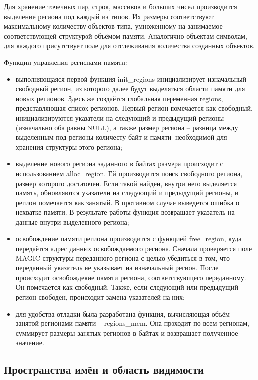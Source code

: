 Для хранение точечных пар, строк, массивов и больших чисел производится выделение региона под каждый из типов. Их размеры соответствуют максимальному количеству объектов типа, умноженному на занимаемое соответствующей структурой объёмом памяти. Аналогично объектам-символам, для каждого присутствует поле для отслеживания количества созданных объектов.

Функции управления регионами памяти:

\begin{itemize}
	\item выполняющаяся первой функция init\_regions инициализирует изначальный свободный регион, из которого далее будут выделяться области памяти для новых регионов. Здесь же создаётся глобальная переменная regions, представляющая список регионов. Первый регион помечается как свободный, инициализируются указатели на следующий и предыдущий регионы (изначально оба равны NULL), а также размер региона -- разница между выделенным под регионы количесту байт и памяти, необходимой для хранения структуры этого региона;
	
	\item выделение нового региона заданного в байтах размера происходит с использованием alloc\_region. Ей производится поиск свободного региона, размер которого достаточен. Если такой найден, внутри него выделяется память, обновляются указатели на следующий и предыдущий регионы, и регион помечается как занятый. В противном случае выведется ошибка о нехватке памяти. В результате работы функция возвращает указатель на данные внутри выделенного региона;
	
	\item освобождение памяти региона производится с функцией free\_region, куда передаётся адрес данных освобождаемого региона. Сначала проверяется поле MAGIC структуры переданного региона с целью убедиться в том, что переданный указатель не указывает на изначальный регион. После происходит освобождение памяти региона, соответствующего переданному. Он помечается как свободный. Также, если следующий или предыдущий регион свободен, происходит замена указателей на них;
	
	\item для удобства отладки была разработана функция, вычисляющая объём занятой регионами памяти -- regions\_mem. Она проходит по всем регионам, суммирует размеры занятых регионов в байтах и возвращает полученное значение.
\end{itemize}


\subsection{Пространства имён и область видимости}

